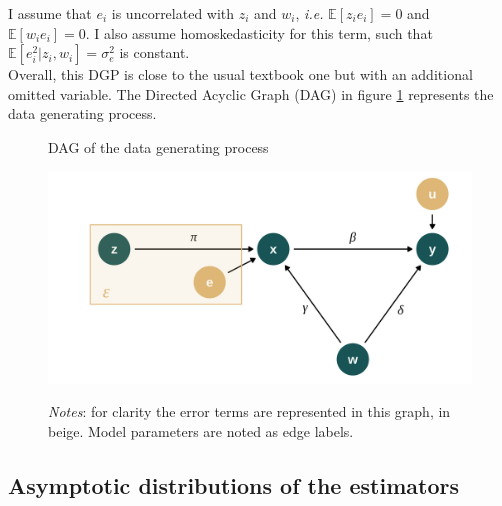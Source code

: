 \documentclass[usletter, 12pt]{article}
\begin{document}
				I assume that $e_{i}$ is uncorrelated with $z_i$ and $w_{i}$, \textit{i.e.} $\mathbb{E}[z_ie_{i}] = 0$ and $\mathbb{E}[w_ie_{i}] = 0$. I also assume homoskedasticity for this term, such that $\mathbb{E}[e_{i}^{2} | z_{i}, w_{i}] = \sigma_{e}^{2}$ is constant.\\ %
				
				Overall, this DGP is close to the usual textbook one but with an additional omitted variable. The Directed Acyclic Graph (DAG) in figure \ref{DAG} represents the data generating process.
			
			 \begin{figure}[!h] 
                    			\begin{center}
                    				\caption{DAG of the data generating process}
                    				\label{DAG}
                    				\includegraphics[width=0.6\linewidth]{images/DAG_maths.png}
                                   \caption*{\footnotesize \textit{Notes}: for clarity the error terms are represented in this graph, in beige. Model parameters are noted as edge labels.}
                                    \end{center}
				\vspace{-1cm}
                    		\end{figure} 

				
		
		\subsection{Asymptotic distributions of the estimators}\label{maths_asymptotics}			 
			
\end{document}
